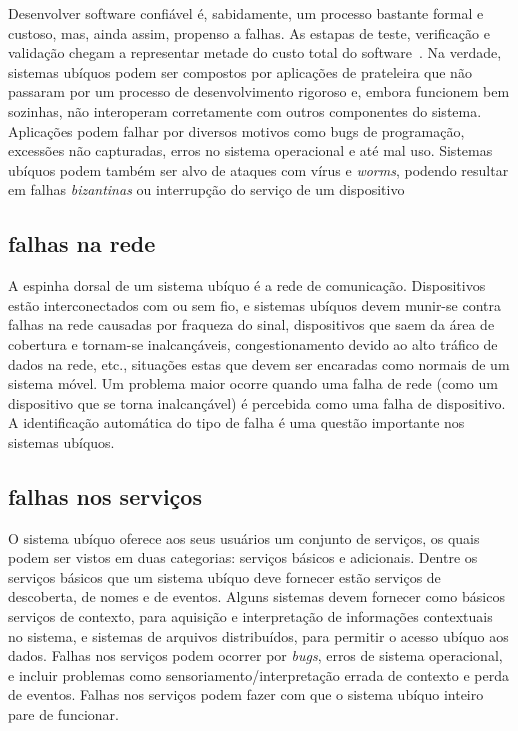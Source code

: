 Desenvolver software confiável é, sabidamente, um processo bastante formal e custoso, mas, ainda assim, propenso a falhas. As estapas de teste, verificação e validação chegam a representar metade do custo total do software~\cite{hailpern2002software}. Na verdade, sistemas ubíquos podem ser compostos por aplicações de prateleira que não passaram por um processo de desenvolvimento rigoroso e, embora funcionem bem sozinhas, não interoperam corretamente com outros componentes do sistema. Aplicações podem falhar por diversos motivos como bugs de programação, excessões não capturadas, erros no sistema operacional e até mal uso. Sistemas ubíquos podem também ser alvo de ataques com vírus e \emph{worms}, podendo resultar em falhas \emph{bizantinas} ou interrupção do serviço de um dispositivo


\subsection{falhas na rede} %
\label{sub:falhas_na_rede}

A espinha dorsal de um sistema ubíquo é a rede de comunicação. Dispositivos estão interconectados com ou sem fio, e sistemas ubíquos devem munir-se contra falhas na rede causadas por fraqueza do sinal, dispositivos que saem da área de cobertura e tornam-se inalcançáveis, congestionamento devido ao alto tráfico de dados na rede, etc., situações estas que devem ser encaradas como normais de um sistema móvel. Um problema maior ocorre quando uma falha de rede (como um dispositivo que se torna inalcançável) é percebida como uma falha de dispositivo. A identificação automática do tipo de falha é uma questão importante nos sistemas ubíquos.


\subsection{falhas nos serviços} %
\label{sub:falhas_nos_servicos}
O sistema ubíquo oferece aos seus usuários um conjunto de serviços, os quais podem ser vistos em duas categorias: serviços básicos e adicionais. Dentre os serviços básicos que um sistema ubíquo deve fornecer estão serviços de descoberta, de nomes e de eventos. Alguns sistemas devem fornecer como básicos serviços de contexto, para aquisição e interpretação de informações contextuais no sistema, e sistemas de arquivos distribuídos, para permitir o acesso ubíquo aos dados. Falhas nos serviços podem ocorrer por \emph{bugs}, erros de sistema operacional, e incluir problemas como sensoriamento/interpretação errada de contexto e perda de eventos. Falhas nos serviços podem fazer com que o sistema ubíquo inteiro pare de funcionar.

